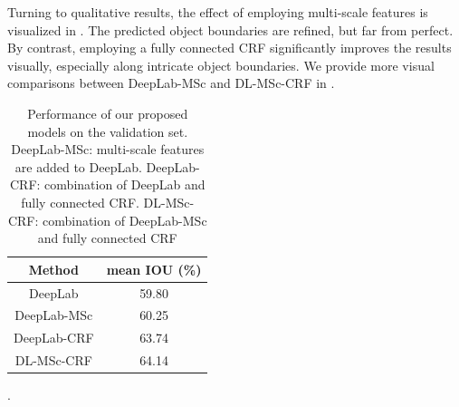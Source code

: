Turning to qualitative results, the effect of employing multi-scale features is visualized in . The predicted object boundaries are refined, but   far from perfect. By contrast, employing a fully connected CRF significantly improves the results visually, especially along intricate object boundaries. We provide more visual comparisons between DeepLab-MSc and DL-MSc-CRF in .

\begin{table}
  \centering
  \begin{tabular}{c | c}
    Method      & mean IOU (\%) \\
    \hline
    DeepLab     & 59.80 \\
    DeepLab-MSc & 60.25 \\
    DeepLab-CRF & 63.74 \\
    DL-MSc-CRF  & 64.14 \\
  \end{tabular}
  \caption{Performance of our proposed models on the validation set. DeepLab-MSc: multi-scale features are added to DeepLab. DeepLab-CRF: combination of DeepLab and fully connected CRF. DL-MSc-CRF: combination of DeepLab-MSc and fully connected CRF}.
  \label{tb:valIOU}
\end{table}

